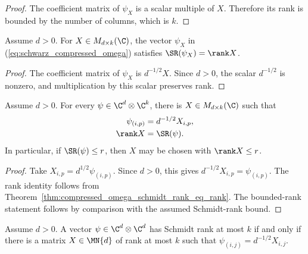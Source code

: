 \begin{proof}
    \leanok
    The coefficient matrix of $\psi_X$ is a scalar multiple of $X$. Therefore
    its rank is bounded by the number of columns, which is $k$.
\end{proof}

\begin{theorem}
    \label{thm:compressed_omega_schmidt_rank_eq_rank}
    \leanok
    Assume $d>0$. For $X\in M_{d\times k}(\C)$, the vector $\psi_X$ in
    (\ref{eq:schwarz_compressed_omega}) satisfies
    $\SR(\psi_X)=\rank X$.
\end{theorem}

\begin{proof}
    \leanok
    The coefficient matrix of $\psi_X$ is $d^{-1/2}X$. Since $d>0$, the
    scalar $d^{-1/2}$ is nonzero, and multiplication by this scalar preserves
    rank.
\end{proof}

\begin{theorem}
    \label{thm:schmidt_rank_exact_parametrization}
    \leanok
    Assume $d>0$. For every $\psi\in\C^d\otimes\C^k$, there is
    $X\in M_{d\times k}(\C)$ such that
    \begin{align}
        \psi_{(i,p)}
         & =d^{-1/2}X_{i,p}, \notag \\
        \rank X
         & =\SR(\psi).
        \label{eq:schwarz_schmidt_representative}
    \end{align}
    In particular, if $\SR(\psi)\le r$, then $X$ may be chosen with
    $\rank X\le r$.
\end{theorem}

\begin{proof}
    \leanok
    Take $X_{i,p}=d^{1/2}\psi_{(i,p)}$. Since $d>0$, this gives
    $d^{-1/2}X_{i,p}=\psi_{(i,p)}$. The rank identity follows from
    Theorem~\ref{thm:compressed_omega_schmidt_rank_eq_rank}. The bounded-rank
    statement follows by comparison with the assumed Schmidt-rank bound.
\end{proof}

\begin{lemma}
    \label{lem:schmidt_rank_square_compressed_omega}
    \leanok
    Assume $d>0$. A vector $\psi\in\C^d\otimes\C^d$ has Schmidt rank at most
    $k$ if and only if there is a matrix $X\in\MN{d}$ of rank at most $k$
    such that $\psi_{(i,j)}=d^{-1/2}X_{i,j}$.
\end{lemma}

